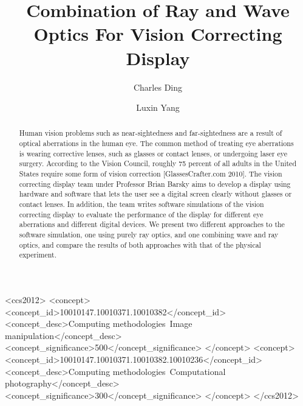 \documentclass{acmsiggraph}
\title{Combination of Ray and Wave Optics For Vision Correcting Display}
\author{
	Charles Ding\\
	\text{M.S. in EECS, University of California, Berkeley}
	\and
	Luxin Yang\\
	\text{M.S. in EECS, University of California, Berkeley}
}
\begin{document}
\lstset{language=C++, breaklines=true, basicstyle=\ttfamily\small}   



\maketitle

\begin{abstract}

Human vision problems such as near-sightedness and far-sightedness are a result of optical aberrations in the human eye. The common method of treating eye aberrations is wearing corrective lenses, such as glasses or contact lenses, or undergoing laser eye surgery. According to the Vision Council, roughly 75 percent of all adults in the United States require some form of vision correction [GlassesCrafter.com 2010]. The vision correcting display team under Professor Brian Barsky aims to develop a display using hardware and software that lets the user see a digital screen clearly without glasses or contact lenses. In addition, the team writes software simulations of the vision correcting display to evaluate the performance of the display for different eye aberrations and different digital devices. We present two different approaches to the software simulation, one using purely ray optics, and one combining wave and ray optics, and compare the results of both approaches with that of the physical experiment.

\end{abstract}

%
%
\begin{CCSXML}
<ccs2012>
<concept>
<concept_id>10010147.10010371.10010382</concept_id>
<concept_desc>Computing methodologies~Image manipulation</concept_desc>
<concept_significance>500</concept_significance>
</concept>
<concept>
<concept_id>10010147.10010371.10010382.10010236</concept_id>
<concept_desc>Computing methodologies~Computational photography</concept_desc>
<concept_significance>300</concept_significance>
</concept>
</ccs2012>
\end{CCSXML}
\end{document}

